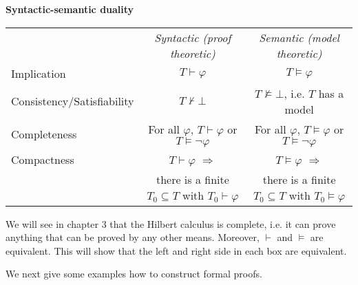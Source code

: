 \documentclass[a4paper, 11pt]{amsart}
\theoremstyle{remark}
\begin{document}
\bigskip 
\begin{center} 
{\bf Syntactic-semantic duality} 
\end{center} 
\bigskip 

\begin{changemargin}{-1cm}{-1cm} 

\begin{tabular}{l | c | c }
\ & \emph{Syntactic (proof theoretic)}  & \emph{Semantic (model theoretic)} \\ 
Implication &  $T \vdash \varphi$ & $T\models \varphi$ \\ 
Consistency/Satisfiability  &  $T \not\vdash \bot$ &  $T \not\models \bot$, i.e. $T$ has a model \\ 
Completeness & For all $\varphi$,  $T\vdash \varphi$ or $T\vDash \neg \varphi$ & For all $\varphi$,  $T\vDash \varphi$ or $T\vDash \neg \varphi$  \\ 
Compactness & $T\vdash \varphi$ $\Rightarrow$ & $T\models \varphi$ $\Rightarrow$  \\ 

& there is a finite $T_0\subseteq T$ with $T_0\vdash \varphi$  & there is a finite $T_0\subseteq T$ with $T_0\models \varphi$
\end{tabular}
\end{changemargin} 


\bigskip 

We will see in chapter 3 that the Hilbert calculus is complete, i.e. it can prove anything that can be proved by any other means. 
Moreover, $\vdash$ and $\vDash$ are equivalent. 
This will show that the left and right side in each box are equivalent. 


We next give some examples how to construct formal proofs. 
\end{document}
